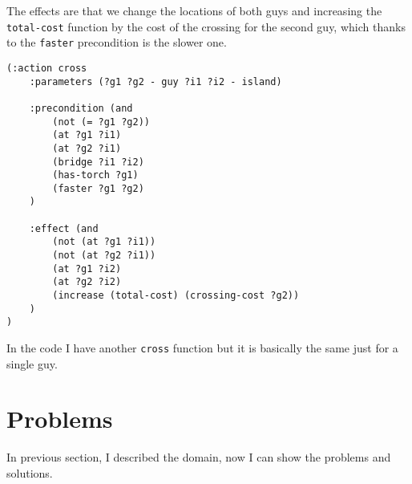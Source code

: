 \documentclass[a4paper,11pt]{article}
\begin{document}
The effects are that we change the locations of both guys and increasing the \texttt{total-cost} function by the cost of the crossing for the second guy, which thanks to the \texttt{faster} precondition is the slower one.
\begin{verbatim}
(:action cross
    :parameters (?g1 ?g2 - guy ?i1 ?i2 - island)

    :precondition (and
        (not (= ?g1 ?g2))
        (at ?g1 ?i1)
        (at ?g2 ?i1)
        (bridge ?i1 ?i2)
        (has-torch ?g1)
        (faster ?g1 ?g2)
    )

    :effect (and
        (not (at ?g1 ?i1))
        (not (at ?g2 ?i1))
        (at ?g1 ?i2)
        (at ?g2 ?i2)
        (increase (total-cost) (crossing-cost ?g2))
    )
)
\end{verbatim}
In the code I have another \texttt{cross} function but it is basically the same just for a single guy.

\section*{Problems}
In previous section, I described the domain, now I can show the problems and solutions.
\end{document}
